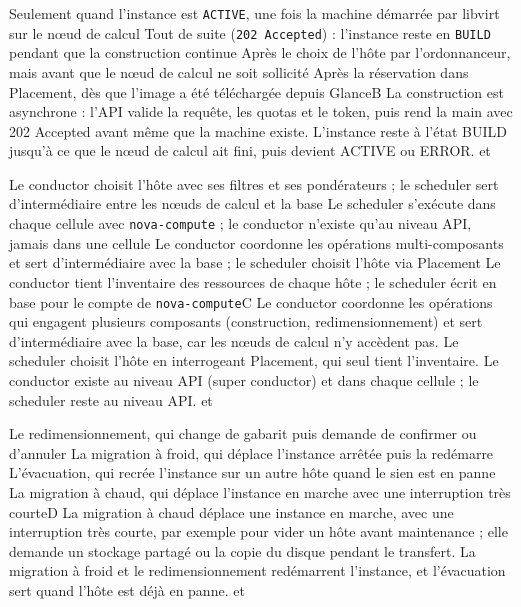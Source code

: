   {Seulement quand l'instance est \texttt{ACTIVE}, une fois la machine démarrée par libvirt sur le nœud de calcul}
  {Tout de suite (\texttt{202 Accepted}) : l'instance reste en \texttt{BUILD} pendant que la construction continue}
  {Après le choix de l'hôte par l'ordonnanceur, mais avant que le nœud de calcul ne soit sollicité}
  {Après la réservation dans Placement, dès que l'image a été téléchargée depuis Glance}{B}
  {La construction est asynchrone : l'API valide la requête, les quotas et le token, puis rend la main avec 202 Accepted avant même que la machine existe. L'instance reste à l'état BUILD jusqu'à ce que le nœud de calcul ait fini, puis devient ACTIVE ou ERROR.}
  { et }

  {Le conductor choisit l'hôte avec ses filtres et ses pondérateurs ; le scheduler sert d'intermédiaire entre les nœuds de calcul et la base}
  {Le scheduler s'exécute dans chaque cellule avec \texttt{nova-compute} ; le conductor n'existe qu'au niveau API, jamais dans une cellule}
  {Le conductor coordonne les opérations multi-composants et sert d'intermédiaire avec la base ; le scheduler choisit l'hôte via Placement}
  {Le conductor tient l'inventaire des ressources de chaque hôte ; le scheduler écrit en base pour le compte de \texttt{nova-compute}}{C}
  {Le conductor coordonne les opérations qui engagent plusieurs composants (construction, redimensionnement) et sert d'intermédiaire avec la base, car les nœuds de calcul n'y accèdent pas. Le scheduler choisit l'hôte en interrogeant Placement, qui seul tient l'inventaire. Le conductor existe au niveau API (super conductor) et dans chaque cellule ; le scheduler reste au niveau API.}
  { et }

  {Le redimensionnement, qui change de gabarit puis demande de confirmer ou d'annuler}
  {La migration à froid, qui déplace l'instance arrêtée puis la redémarre}
  {L'évacuation, qui recrée l'instance sur un autre hôte quand le sien est en panne}
  {La migration à chaud, qui déplace l'instance en marche avec une interruption très courte}{D}
  {La migration à chaud déplace une instance en marche, avec une interruption très courte, par exemple pour vider un hôte avant maintenance ; elle demande un stockage partagé ou la copie du disque pendant le transfert. La migration à froid et le redimensionnement redémarrent l'instance, et l'évacuation sert quand l'hôte est déjà en panne.}
  { et }

